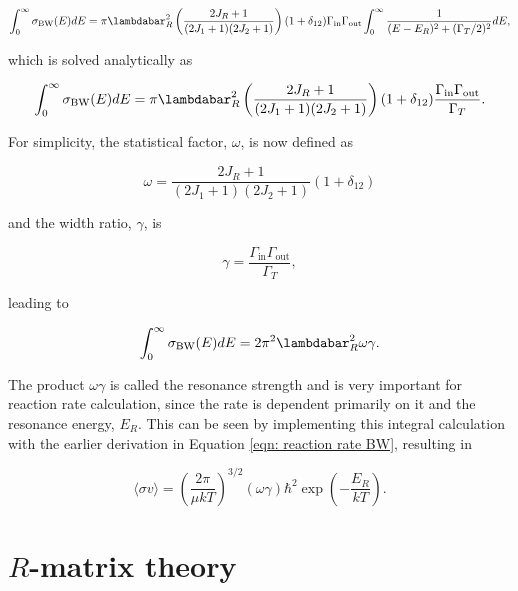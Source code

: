 \begin{equation}
\int_{0}^{\infty} \sigma_{\text{BW}} (E) dE = \pi \lambdabar_{R}^{2} \left(  \frac{2J_R+1}{(2J_1+1)(2J_2+1)} \right) (1 + \delta_{12}) \Gamma_{\text{in}} \Gamma_{\text{out}} \int_{0}^{\infty} \dfrac{1}{(E-E_{R})^{2} + (\Gamma_{T}/2)^{2}} dE,
\end{equation}

\noindent which is solved analytically as

\begin{equation}
\int_{0}^{\infty} \sigma_{\text{BW}} (E) dE = \pi \lambdabar_{R}^{2} \left(  \frac{2J_R+1}{(2J_1+1)(2J_2+1)} \right)  (1 + \delta_{12}) \frac{\Gamma_{\text{in}} \Gamma_{\text{out}} }{\Gamma_{T}}.
\end{equation}

\noindent For simplicity, the statistical factor, $\omega$, is now defined as

\begin{equation}
\omega = \frac{2J_R+1}{(2J_1+1)(2J_2+1)} (1 + \delta_{12})
\label{eqn: statisticalFactor}
\end{equation}

\noindent and the width ratio, $\gamma$, is

\begin{equation}
\gamma = \dfrac{\Gamma_{\text{in}} \Gamma_{\text{out}}}{\Gamma_{T}}, 
\end{equation}

\noindent leading to 

\begin{equation}
\int_{0}^{\infty} \sigma_{\text{BW}} (E) dE = 2\pi^{2} \lambdabar_{R}^{2} \omega \gamma.
\end{equation}

\noindent The product $\omega \gamma$ is called the resonance strength and is very important for reaction rate calculation, since the rate is dependent primarily on it and the resonance energy, $E_{R}$. This can be seen by implementing this integral calculation with the earlier derivation in Equation \ref{eqn: reaction rate BW}, resulting in

\begin{equation}
\langle \sigma v \rangle = \left(  \dfrac{2 \pi}{\mu k T} \right)^{3/2} (\omega \gamma) \hbar^{2} \exp \left( - \dfrac{E_{R}}{k T} \right).
\end{equation}



\section{$R$-matrix theory}
\label{sec: r-matrix}

